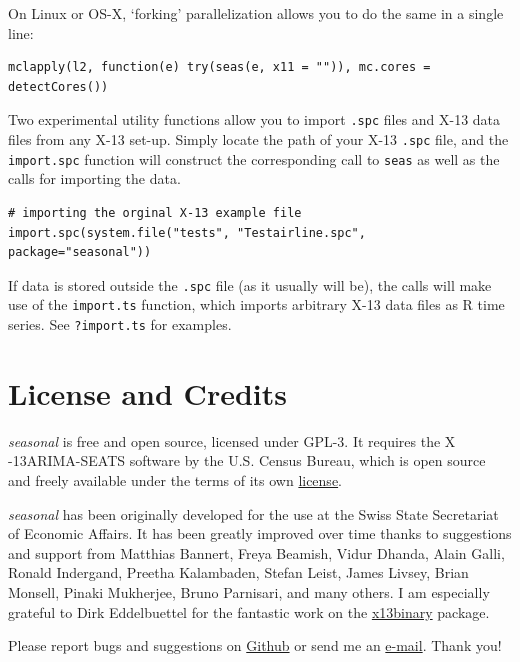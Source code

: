 On Linux or OS-X, `forking' parallelization allows you to do the same in
a single line:

\begin{verbatim}
mclapply(l2, function(e) try(seas(e, x11 = "")), mc.cores = detectCores())
\end{verbatim}


Two experimental utility functions allow you to import \texttt{.spc}
files and X-13 data files from any X-13 set-up. Simply locate the path
of your X-13 \texttt{.spc} file, and the \texttt{import.spc} function
will construct the corresponding call to \texttt{seas} as well as the
calls for importing the data.

\begin{verbatim}
# importing the orginal X-13 example file
import.spc(system.file("tests", "Testairline.spc", package="seasonal"))
\end{verbatim}

If data is stored outside the \texttt{.spc} file (as it usually will
be), the calls will make use of the \texttt{import.ts} function, which
imports arbitrary X-13 data files as R time series. See
\texttt{?import.ts} for examples.

\section{License and Credits}\label{license-and-credits}

\emph{seasonal} is free and open source, licensed under GPL-3. It
requires the X -13ARIMA-SEATS software by the U.S. Census Bureau, which
is open source and freely available under the terms of its own
\href{https://www.census.gov/srd/www/disclaimer.html}{license}.

\emph{seasonal} has been originally developed for the use at the Swiss
State Secretariat of Economic Affairs. It has been greatly improved over
time thanks to suggestions and support from Matthias Bannert, Freya
Beamish, Vidur Dhanda, Alain Galli, Ronald Indergand, Preetha
Kalambaden, Stefan Leist, James Livsey, Brian Monsell, Pinaki Mukherjee,
Bruno Parnisari, and many others. I am especially grateful to Dirk
Eddelbuettel for the fantastic work on the
\href{https://cran.r-project.org/package=x13binary}{x13binary} package.

Please report bugs and suggestions on
\href{https://github.com/christophsax/seasonal}{Github} or send me an
\href{mailto:christoph.sax@gmail.com}{e-mail}. Thank you!
